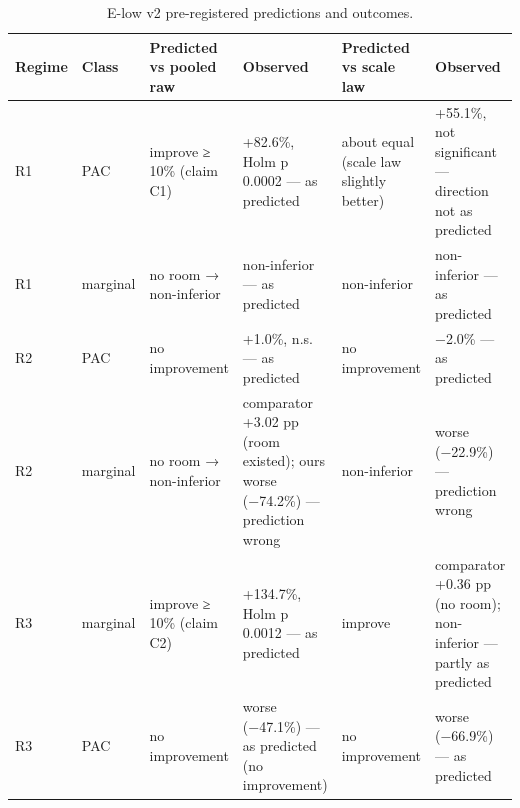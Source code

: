 \documentclass[preprint,12pt,authoryear]{elsarticle}
\begin{document}
\begin{table}[!htbp]
\centering
\footnotesize
\renewcommand{\thetable}{S10}\caption{E-low v2 pre-registered predictions and outcomes.}
\begin{tabularx}{\textwidth}{@{}lll>{\raggedright\arraybackslash\hsize=1.01\hsize}X>{\raggedright\arraybackslash\hsize=0.98\hsize}X>{\raggedright\arraybackslash\hsize=1.01\hsize}X@{}}
\toprule
\textbf{Regime} & \textbf{Class} & \textbf{Predicted vs pooled raw} & \textbf{Observed} & \textbf{Predicted vs scale law} & \textbf{Observed} \\
\midrule
R1 & PAC & improve ≥ 10\% (claim C1) & +82.6\%, Holm p 0.0002 --- as predicted & about equal (scale law slightly better) & +55.1\%, not significant --- direction not as predicted \\
R1 & marginal & no room → non-inferior & non-inferior --- as predicted & non-inferior & non-inferior --- as predicted \\
R2 & PAC & no improvement & +1.0\%, n.s. --- as predicted & no improvement & −2.0\% --- as predicted \\
R2 & marginal & no room → non-inferior & comparator +3.02 pp (room existed); ours worse (−74.2\%) --- prediction wrong & non-inferior & worse (−22.9\%) --- prediction wrong \\
R3 & marginal & improve ≥ 10\% (claim C2) & +134.7\%, Holm p 0.0012 --- as predicted & improve & comparator +0.36 pp (no room); non-inferior --- partly as predicted \\
R3 & PAC & no improvement & worse (−47.1\%) --- as predicted (no improvement) & no improvement & worse (−66.9\%) --- as predicted \\
\bottomrule
\end{tabularx}
\end{table}
\end{document}
